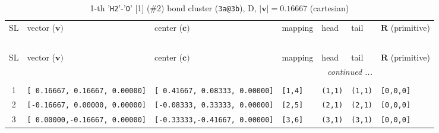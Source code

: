 \documentclass[fleqn,10pt,landscape]{jsarticle}
\begin{document}
\begin{longtable}[l]{cllllll}
\captionsetup{justification=raggedright, singlelinecheck=off}
\caption{1-th '\texttt{H2}'-'\texttt{O}' [1] (\#2) bond cluster (\texttt{3a@3b}), D, $|\bm{v}|=0.16667$ (cartesian)}
 \\
 \hline \hline
SL & vector ($\bm{v})$ & center ($\bm{c})$ & mapping & head & tail & $\bm{R}$ (primitive) \\ \hline \endfirsthead

\multicolumn{6}{l}{\tablename\ \thetable{}} \\
 \hline \hline
SL & vector ($\bm{v})$ & center ($\bm{c})$ & mapping & head & tail & $\bm{R}$ (primitive) \\ \hline \endhead

 \hline \hline
\multicolumn{6}{r}{\footnotesize\it continued ...} \\ \endfoot

 \hline \hline
\multicolumn{6}{r}{} \\ \endlastfoot

1 & \texttt{[ 0.16667, 0.16667, 0.00000]} & \texttt{[ 0.41667, 0.08333, 0.00000]} & \texttt{[1,4]} & \texttt{(1,1)} & \texttt{(1,1)} & \texttt{[0,0,0]} \\ \hline
2 & \texttt{[-0.16667, 0.00000, 0.00000]} & \texttt{[-0.08333, 0.33333, 0.00000]} & \texttt{[2,5]} & \texttt{(2,1)} & \texttt{(2,1)} & \texttt{[0,0,0]} \\ \hline
3 & \texttt{[ 0.00000,-0.16667, 0.00000]} & \texttt{[-0.33333,-0.41667, 0.00000]} & \texttt{[3,6]} & \texttt{(3,1)} & \texttt{(3,1)} & \texttt{[0,0,0]} \\
\end{longtable}
\end{document}
